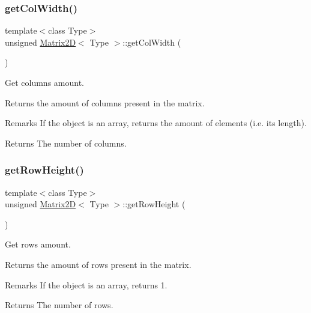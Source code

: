 \subsubsection{\texorpdfstring{get\+Col\+Width()}{getColWidth()}}
{\footnotesize\ttfamily template$<$class Type$>$ \\
unsigned \hyperlink{classMatrix2D}{Matrix2D}$<$ Type $>$\+::get\+Col\+Width (\begin{DoxyParamCaption}{ }\end{DoxyParamCaption})\hspace{0.3cm}{\ttfamily [inline]}}



Get columns amount. 

Returns the amount of columns present in the matrix. \begin{DoxyRemark}{Remarks}
If the object is an array, returns the amount of elements (i.\+e. its length). 
\end{DoxyRemark}
\begin{DoxyReturn}{Returns}
The number of columns. 
\end{DoxyReturn}
\mbox{\label{classMatrix2D_acc55ef0f69af583aaefb8a484b4c2ca7}} 
\subsubsection{\texorpdfstring{get\+Row\+Height()}{getRowHeight()}}
{\footnotesize\ttfamily template$<$class Type$>$ \\
unsigned \hyperlink{classMatrix2D}{Matrix2D}$<$ Type $>$\+::get\+Row\+Height (\begin{DoxyParamCaption}{ }\end{DoxyParamCaption})\hspace{0.3cm}{\ttfamily [inline]}}



Get rows amount. 

Returns the amount of rows present in the matrix. \begin{DoxyRemark}{Remarks}
If the object is an array, returns 1. 
\end{DoxyRemark}
\begin{DoxyReturn}{Returns}
The number of rows. 
\end{DoxyReturn}
\mbox{\label{classMatrix2D_aa9a6df1e7cc653d635baedc659ea00f7}} 
